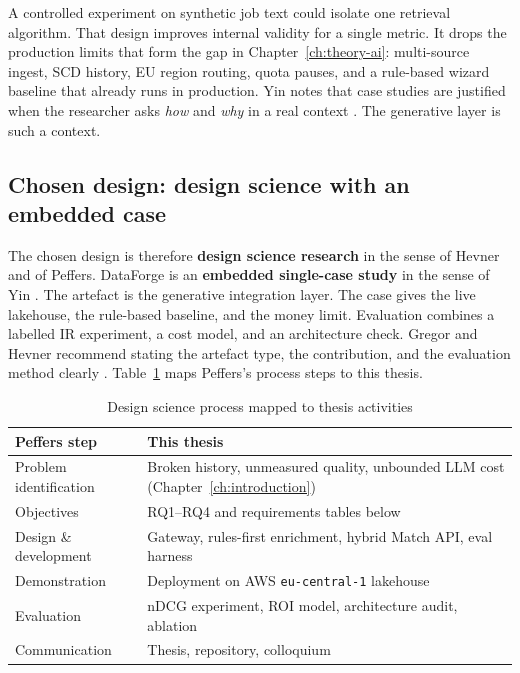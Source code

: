 A controlled experiment on synthetic job text could isolate one retrieval algorithm. That design improves internal validity for a single metric. It drops the production limits that form the gap in Chapter~\ref{ch:theory-ai}: multi-source ingest, SCD history, EU region routing, quota pauses, and a rule-based wizard baseline that already runs in production. Yin notes that case studies are justified when the researcher asks \emph{how} and \emph{why} in a real context . The generative layer is such a context.

\subsection{Chosen design: design science with an embedded case}

The chosen design is therefore \textbf{design science research} in the sense of Hevner and of Peffers. DataForge is an \textbf{embedded single-case study} in the sense of Yin . The artefact is the generative integration layer. The case gives the live lakehouse, the rule-based baseline, and the money limit. Evaluation combines a labelled IR experiment, a cost model, and an architecture check. Gregor and Hevner recommend stating the artefact type, the contribution, and the evaluation method clearly . Table~\ref{tab:dsr-mapping} maps Peffers's process steps to this thesis.

\begin{table}[ht]
\centering
\caption{Design science process mapped to thesis activities}
\label{tab:dsr-mapping}
\begin{tabularx}{\textwidth}{@{}lX@{}}
\toprule
\textbf{Peffers step} & \textbf{This thesis} \\
\midrule
Problem identification & Broken history, unmeasured quality, unbounded LLM cost (Chapter~\ref{ch:introduction}) \\
Objectives & RQ1--RQ4 and requirements tables below \\
Design \& development & Gateway, rules-first enrichment, hybrid Match API, eval harness \\
Demonstration & Deployment on AWS \texttt{eu-central-1} lakehouse \\
Evaluation & nDCG experiment, ROI model, architecture audit, ablation \\
Communication & Thesis, repository, colloquium \\
\bottomrule
\end{tabularx}
\end{table}

